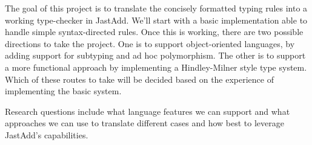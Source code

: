 \documentclass{article}
\begin{document}
The goal of this project is to translate the concisely formatted typing rules into a working type-checker in JastAdd.
We'll start with a basic implementation able to handle simple syntax-directed rules.
Once this is working, there are two possible directions to take the project.
One is to support object-oriented languages, by adding support for subtyping and ad hoc polymorphism.
The other is to support a more functional approach by implementing a Hindley-Milner style type system.
Which of these routes to take will be decided based on the experience of implementing the basic system.

Research questions include what language features we can support and what approaches we can use to translate different cases and how best to leverage JastAdd's capabilities.




\end{document}
